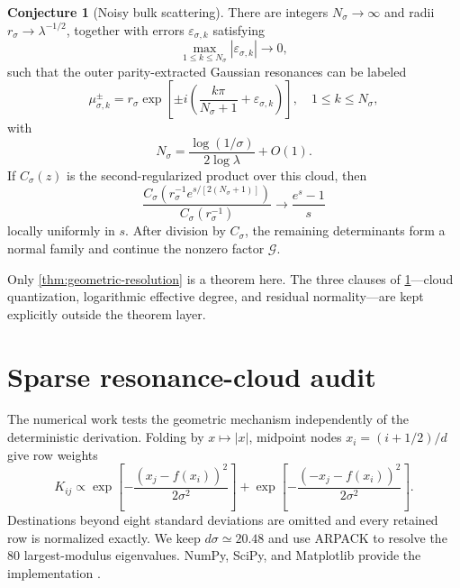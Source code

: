 \documentclass[11pt]{article}
\theoremstyle{definition}
\newtheorem{conjecture}[theorem]{Conjecture}
\theoremstyle{remark}
\newcommand{\cG}{\mathcal G}
\begin{document}
\begin{conjecture}[Noisy bulk scattering]
\label{conj:noisy-scattering}
There are integers $N_\sigma\to\infty$ and radii
$r_\sigma\to\lambda^{-1/2}$, together with errors $\varepsilon_{\sigma,k}$
satisfying
\[
 \max_{1\le k\le N_\sigma}|\varepsilon_{\sigma,k}|\longrightarrow0,
\]
such that the outer parity-extracted Gaussian resonances can be labeled
\begin{equation}\label{eq:noisy-cloud-conjecture}
 \mu_{\sigma,k}^{\pm}
 =r_\sigma
 \exp\left[
 \pm i\left(\frac{k\pi}{N_\sigma+1}+\varepsilon_{\sigma,k}\right)
 \right],
 \quad 1\le k\le N_\sigma,
\end{equation}
with
\begin{equation}\label{eq:degree-conjecture}
 N_\sigma
 =\frac{\log(1/\sigma)}{2\log\lambda}+O(1).
\end{equation}
If $C_\sigma(z)$ is the second-regularized product over this cloud, then
\begin{equation}\label{eq:noisy-scattering-conjecture}
 \frac{C_\sigma\!\left(
 r_\sigma^{-1}e^{s/[2(N_\sigma+1)]}\right)}
 {C_\sigma(r_\sigma^{-1})}
 \longrightarrow\frac{e^s-1}{s}
\end{equation}
locally uniformly in $s$.  After division by $C_\sigma$, the remaining
determinants form a normal family and continue the nonzero factor $\cG$.
\end{conjecture}

Only \cref{thm:geometric-resolution} is a theorem here.  The three clauses of
\cref{conj:noisy-scattering}---cloud quantization, logarithmic effective
degree, and residual normality---are kept explicitly outside the theorem
layer.

\section{Sparse resonance-cloud audit}
\label{sec:numerics}

The numerical work tests the geometric mechanism independently of the
deterministic derivation.  Folding by $x\mapsto|x|$, midpoint nodes
$x_i=(i+1/2)/d$ give row weights
\begin{equation}\label{eq:matrix-weights}
 K_{ij}\propto
 \exp\left[-\frac{(x_j-f(x_i))^2}{2\sigma^2}\right]
 +
 \exp\left[-\frac{(-x_j-f(x_i))^2}{2\sigma^2}\right].
\end{equation}
Destinations beyond eight standard deviations are omitted and every retained
row is normalized exactly.  We keep $d\sigma\simeq20.48$ and use ARPACK to
resolve the 80 largest-modulus eigenvalues.  NumPy, SciPy, and Matplotlib
provide the implementation
\citep{HarrisEtAl2020,VirtanenEtAl2020,Hunter2007}.
\end{document}
